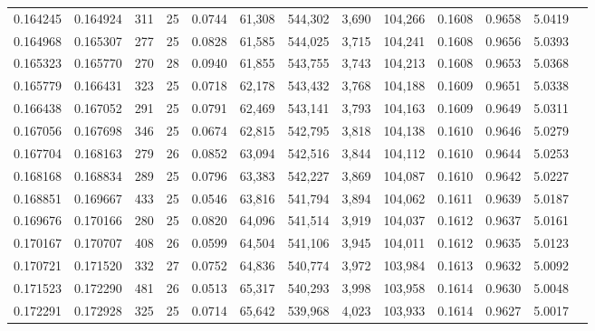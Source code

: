 \begin{tabular}{rrrrrrrrrrrrr}
0.164245 & 0.164924 &   311 &  25 &                                     0.0744 &  61,308 & 544,302 &   3,690 & 104,266 & 0.1608 & 0.9658 & 5.0419 \\
0.164968 & 0.165307 &   277 &  25 &                                     0.0828 &  61,585 & 544,025 &   3,715 & 104,241 & 0.1608 & 0.9656 & 5.0393 \\
0.165323 & 0.165770 &   270 &  28 &                                     0.0940 &  61,855 & 543,755 &   3,743 & 104,213 & 0.1608 & 0.9653 & 5.0368 \\
0.165779 & 0.166431 &   323 &  25 &                                     0.0718 &  62,178 & 543,432 &   3,768 & 104,188 & 0.1609 & 0.9651 & 5.0338 \\
0.166438 & 0.167052 &   291 &  25 &                                     0.0791 &  62,469 & 543,141 &   3,793 & 104,163 & 0.1609 & 0.9649 & 5.0311 \\
0.167056 & 0.167698 &   346 &  25 &                                     0.0674 &  62,815 & 542,795 &   3,818 & 104,138 & 0.1610 & 0.9646 & 5.0279 \\
0.167704 & 0.168163 &   279 &  26 &                                     0.0852 &  63,094 & 542,516 &   3,844 & 104,112 & 0.1610 & 0.9644 & 5.0253 \\
0.168168 & 0.168834 &   289 &  25 &                                     0.0796 &  63,383 & 542,227 &   3,869 & 104,087 & 0.1610 & 0.9642 & 5.0227 \\
0.168851 & 0.169667 &   433 &  25 &                                     0.0546 &  63,816 & 541,794 &   3,894 & 104,062 & 0.1611 & 0.9639 & 5.0187 \\
0.169676 & 0.170166 &   280 &  25 &                                     0.0820 &  64,096 & 541,514 &   3,919 & 104,037 & 0.1612 & 0.9637 & 5.0161 \\
0.170167 & 0.170707 &   408 &  26 &                                     0.0599 &  64,504 & 541,106 &   3,945 & 104,011 & 0.1612 & 0.9635 & 5.0123 \\
0.170721 & 0.171520 &   332 &  27 &                                     0.0752 &  64,836 & 540,774 &   3,972 & 103,984 & 0.1613 & 0.9632 & 5.0092 \\
0.171523 & 0.172290 &   481 &  26 &                                     0.0513 &  65,317 & 540,293 &   3,998 & 103,958 & 0.1614 & 0.9630 & 5.0048 \\
0.172291 & 0.172928 &   325 &  25 &                                     0.0714 &  65,642 & 539,968 &   4,023 & 103,933 & 0.1614 & 0.9627 & 5.0017 \\

\end{tabular}
